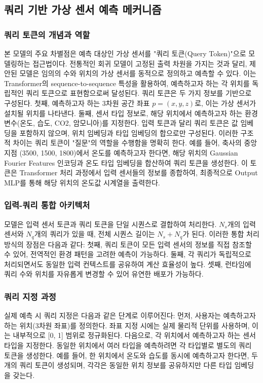 \documentclass[final,5p,times,twocolumn,authoryear]{elsarticle}
\begin{document}
\subsection{쿼리 기반 가상 센서 예측 메커니즘}

\subsubsection{쿼리 토큰의 개념과 역할}
본 모델의 주요 차별점은 예측 대상인 가상 센서를 "쿼리 토큰(Query Token)"으로 모델링하는 접근법이다. 전통적인 회귀 모델이 고정된 출력 차원을 가지는 것과 달리, 제안된 모델은 임의의 수와 위치의 가상 센서를 동적으로 정의하고 예측할 수 있다. 이는 Transformer의 sequence-to-sequence 특성을 활용하여, 예측하고자 하는 각 위치를 독립적인 쿼리 토큰으로 표현함으로써 달성된다.
쿼리 토큰은 두 가지 정보를 기반으로 구성된다. 첫째, 예측하고자 하는 3차원 공간 좌표 $p=(x, y, z)$로, 이는 가상 센서가 설치될 위치를 나타낸다. 둘째, 센서 타입 정보로, 해당 위치에서 예측하고자 하는 환경 변수(온도, 습도, CO2, 암모니아)를 지정한다. 입력 토큰과 달리 쿼리 토큰은 값 임베딩을 포함하지 않으며, 위치 임베딩과 타입 임베딩의 합으로만 구성된다. 이러한 구조적 차이는 쿼리 토큰이 "질문"의 역할을 수행함을 명확히 한다.
예를 들어, 축사의 중앙 지점 (3500, 1500, 1800)에서 온도를 예측하고자 한다면, 해당 위치의 Gaussian Fourier Features 인코딩과 온도 타입 임베딩을 합산하여 쿼리 토큰을 생성한다. 이 토큰은 Transformer 처리 과정에서 입력 센서들의 정보를 종합하여, 최종적으로 Output MLP를 통해 해당 위치의 온도값 시계열을 출력한다.



\subsubsection{입력-쿼리 통합 아키텍처}
모델은 입력 센서 토큰과 쿼리 토큰을 단일 시퀀스로 결합하여 처리한다. $N_s$개의 입력 센서와 $N_q$개의 쿼리가 있을 때, 전체 시퀀스 길이는 $N_s+N_q$가 된다. 이러한 통합 처리 방식의 장점은 다음과 같다:
첫째, 쿼리 토큰이 모든 입력 센서의 정보를 직접 참조할 수 있어, 전역적인 환경 패턴을 고려한 예측이 가능하다. 둘째, 각 쿼리가 독립적으로 처리되면서도 동일한 입력 컨텍스트를 공유하여 계산 효율성이 높다. 셋째, 런타임에 쿼리 수와 위치를 자유롭게 변경할 수 있어 유연한 배포가 가능하다.

\subsubsection{쿼리 지정 과정}
실제 예측 시 쿼리 지정은 다음과 같은 단계로 이루어진다:
먼저, 사용자는 예측하고자 하는 위치(3차원 좌표)를 정의한다. 좌표 지정 시에는 실제 물리적 단위를 사용하며, 이는 내부적으로 [0, 1] 범위로 정규화된다. 다음으로, 각 위치에서 예측하고자 하는 센서 타입을 지정한다. 동일한 위치에서 여러 타입을 예측하려면 각 타입별로 별도의 쿼리 토큰을 생성한다. 예를 들어, 한 위치에서 온도와 습도를 동시에 예측하고자 한다면, 두 개의 쿼리 토큰이 생성되며, 각각은 동일한 위치 정보를 공유하지만 다른 타입 임베딩을 갖는다.
\end{document}
